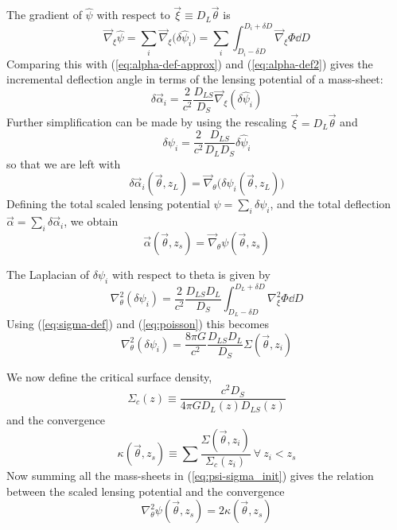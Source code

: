The gradient of $\hat{\psi}$ with respect to 
$\vec{\xi} \equiv D_L\vec{\theta}$ is
\begin{equation}
  \vec{\nabla}_\xi\hat{\psi} 
  = \sum_i \vec{\nabla}_\xi\big(\delta\hat{\psi}_i\big) 
  = \sum_i \int_{D_i - \delta D}^{D_i+\delta D}\vec{\nabla}_\xi \Phi \dd D
\end{equation}
Comparing this with (\ref{eq:alpha-def-approx}) and (\ref{eq:alpha-def2}) gives the incremental deflection angle in terms of the lensing potential of a mass-sheet:
\begin{equation}
  \delta\vec{\alpha}_i = \frac{2}{c^2}\frac{D_{LS}}{D_S}\vec{\nabla}_\xi (\delta\hat{\psi}_i)
\end{equation}
Further simplification can be made by using the rescaling $\vec{\xi} = D_L \vec{\theta}$ and
\begin{equation}
  \delta\psi_i = \frac{2}{c^2}\frac{D_{LS}}{D_L D_S} \delta\hat{\psi}_i
\end{equation}
so that we are left with
\begin{equation}
  \label{eq:alpha-psi}
  \delta\vec{\alpha}_i(\vec{\theta},z_L) = \vec{\nabla}_\theta \Big( \delta\psi_i(\vec{\theta},z_L)\Big)
\end{equation}
Defining the total scaled lensing potential $\psi = \sum_i \delta\psi_i$, and the total deflection $\vec{\alpha} = \sum_i\delta\vec{\alpha}_i$, we obtain
\begin{equation}
  \vec{\alpha}(\vec{\theta},z_s) = \vec{\nabla}_\theta \psi(\vec{\theta},z_s)
\end{equation}

The Laplacian of $\delta\psi_i$ with respect to theta is given by
\begin{equation}
  \nabla_\theta^2 (\delta\psi_i) 
  = \frac{2}{c^2}\frac{D_{LS}D_L}{D_S}\int_{D_L-\delta D}^{D_L+\delta D} 
  \nabla_\xi^2\Phi \dd D
\end{equation}
Using (\ref{eq:sigma-def}) and (\ref{eq:poisson}) this becomes
\begin{equation}
  \label{eq:psi-sigma_init}
  \nabla_\theta^2(\delta\psi_i) = \frac{8\pi G}{c^2}\frac{D_{LS}D_L}{D_S}\Sigma(\vec{\theta},z_i)
\end{equation}

We now define the critical surface density,
\begin{equation}
  \Sigma_{c}(z) \equiv\frac{c^2 D_S}{4\pi G D_L(z) D_{LS}(z)}
\end{equation}
and the convergence
\begin{equation}
  \label{eq:kappa-sigma}
  \kappa(\vec{\theta},z_s) \equiv \sum \frac{\Sigma(\vec{\theta},z_i)}{\Sigma_c(z_i)}\ \forall\ z_i < z_s
\end{equation}
Now summing all the mass-sheets in (\ref{eq:psi-sigma_init}) gives the relation between the scaled lensing potential and the convergence
\begin{equation}
  \label{eq:psi-kappa-1}
  \nabla_\theta^2\psi(\vec{\theta},z_s) = 2\kappa(\vec{\theta},z_s)
\end{equation}

